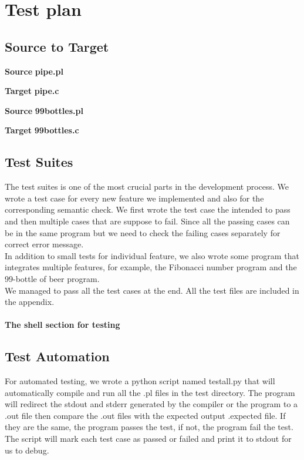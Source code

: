 \documentclass[./Report_main.tex]{subfiles}
\begin{document}


\chapter{Test plan}
\section{Source to Target}
\textbf{Source}
\textbf{pipe.pl}

\textbf{Target}
\textbf{pipe.c}

\textbf{Source}
\textbf{99bottles.pl}

\textbf{Target}
\textbf{99bottles.c}

\section{Test Suites}
The test suites is one of the most crucial parts in the development process. We wrote a test case for every new feature we implemented and also for the corresponding semantic check. We first wrote the test case the intended to pass and then multiple cases that are suppose to fail. Since all the passing cases can be in the same program but we need to check the failing cases separately for correct error message.\\
In addition to small tests for individual feature, we also wrote some program that integrates multiple features, for example, the Fibonacci number program and the 99-bottle of beer program.\\
We managed to pass all the test cases at the end. All the test files are included in the appendix.\\
\vspace{5mm}\\
\textbf{The shell section for testing}
\section{Test Automation}
For automated testing, we wrote a python script named testall.py that will automatically compile and run all the .pl files in the test directory. The program will redirect the stdout and stderr generated by the compiler or the program to a .out file then compare the .out files with the expected output .expected file. If they are the same, the program passes the test, if not, the program fail the test. The script will mark each test case as passed or failed and print it to stdout for us to debug.\\
\end{document}
